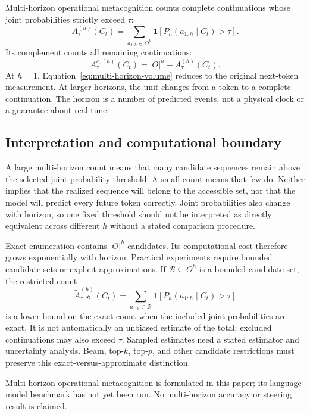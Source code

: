 \documentclass[11pt,a4paper]{article}
\begin{document}
Multi-horizon operational metacognition counts complete continuations whose joint probabilities strictly exceed $\tau$:
\begin{equation}
A^{(h)}_\tau(C_t)=
\sum_{a_{1:h}\in O^h}
\mathbf{1}\!\left[P_h(a_{1:h}\mid C_t)>\tau\right].
\label{eq:multi-horizon-volume}
\end{equation}
Its complement counts all remaining continuations:
\begin{equation}
A^{c,(h)}_\tau(C_t)=|O|^h-A^{(h)}_\tau(C_t).
\label{eq:multi-horizon-complement}
\end{equation}
At $h=1$, Equation~\ref{eq:multi-horizon-volume} reduces to the original next-token measurement. At larger horizons, the unit changes from a token to a complete continuation. The horizon is a number of predicted events, not a physical clock or a guarantee about real time.

\subsection{Interpretation and computational boundary}
A large multi-horizon count means that many candidate sequences remain above the selected joint-probability threshold. A small count means that few do. Neither implies that the realized sequence will belong to the accessible set, nor that the model will predict every future token correctly. Joint probabilities also change with horizon, so one fixed threshold should not be interpreted as directly equivalent across different $h$ without a stated comparison procedure.

Exact enumeration contains $|O|^h$ candidates. Its computational cost therefore grows exponentially with horizon. Practical experiments require bounded candidate sets or explicit approximations. If $\mathcal{B}\subseteq O^h$ is a bounded candidate set, the restricted count
\begin{equation}
\widetilde A^{(h)}_{\tau,\mathcal{B}}(C_t)=
\sum_{a_{1:h}\in\mathcal{B}}
\mathbf{1}\!\left[P_h(a_{1:h}\mid C_t)>\tau\right]
\end{equation}
is a lower bound on the exact count when the included joint probabilities are exact. It is not automatically an unbiased estimate of the total: excluded continuations may also exceed $\tau$. Sampled estimates need a stated estimator and uncertainty analysis. Beam, top-$k$, top-$p$, and other candidate restrictions must preserve this exact-versus-approximate distinction.

Multi-horizon operational metacognition is formulated in this paper; its language-model benchmark has not yet been run. No multi-horizon accuracy or steering result is claimed.
\end{document}
